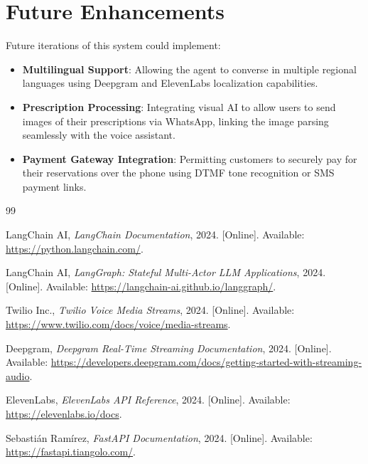 \documentclass[12pt,a4paper]{report}
\begin{document}
\section{Future Enhancements}
Future iterations of this system could implement:
\begin{itemize}
    \item \textbf{Multilingual Support}: Allowing the agent to converse in multiple regional languages using Deepgram and ElevenLabs localization capabilities.
    \item \textbf{Prescription Processing}: Integrating visual AI to allow users to send images of their prescriptions via WhatsApp, linking the image parsing seamlessly with the voice assistant.
    \item \textbf{Payment Gateway Integration}: Permitting customers to securely pay for their reservations over the phone using DTMF tone recognition or SMS payment links.
\end{itemize}

\begin{thebibliography}{99}

LangChain AI, \textit{LangChain Documentation}, 2024. [Online]. Available: \url{https://python.langchain.com/}.

LangChain AI, \textit{LangGraph: Stateful Multi-Actor LLM Applications}, 2024. [Online]. Available: \url{https://langchain-ai.github.io/langgraph/}.

Twilio Inc., \textit{Twilio Voice Media Streams}, 2024. [Online]. Available: \url{https://www.twilio.com/docs/voice/media-streams}.

Deepgram, \textit{Deepgram Real-Time Streaming Documentation}, 2024. [Online]. Available: \url{https://developers.deepgram.com/docs/getting-started-with-streaming-audio}.

ElevenLabs, \textit{ElevenLabs API Reference}, 2024. [Online]. Available: \url{https://elevenlabs.io/docs}.

Sebastián Ramírez, \textit{FastAPI Documentation}, 2024. [Online]. Available: \url{https://fastapi.tiangolo.com/}.

\end{thebibliography}
\end{document}
